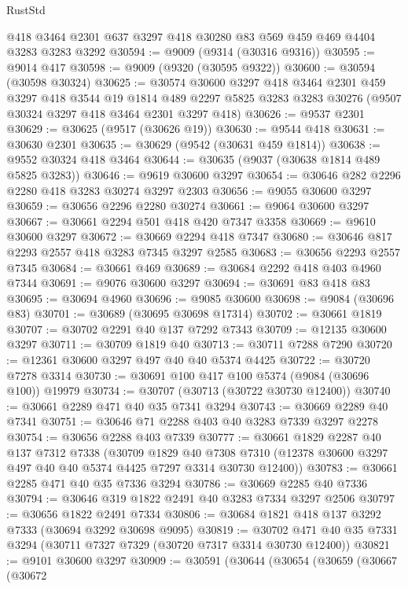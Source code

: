 \begin{lexlean}{RustStd}
\begin{coremodule}
    @418
    @3464
    @2301
    @637
    @3297
    @418
    @30280
    @83
    @569
    @459
    @469
    @4404
    @3283
    @3283
    @3292
@30594 := @9009 (@9314 (@30316 @9316))
@30595 := @9014 @417
@30598 := @9009 (@9320 (@30595 @9322))
@30600 := @30594 (@30598 @30324)
@30625 := @30574
    @30600
    @3297
    @418
    @3464
    @2301
    @459
    @3297
    @418
    @3544
    @19
    @1814
    @489
    @2297
    @5825
    @3283
    @3283
    @30276
    (@9507 @30324 @3297 @418 @3464 @2301 @3297 @418)
@30626 := @9537 @2301
@30629 := @30625 (@9517 (@30626 @19))
@30630 := @9544 @418
@30631 := @30630 @2301
@30635 := @30629 (@9542 (@30631 @459 @1814))
@30638 := @9552 @30324 @418 @3464
@30644 := @30635 (@9037 (@30638 @1814 @489 @5825 @3283))
@30646 := @9619 @30600 @3297
@30654 := @30646 @282 @2296 @2280 @418 @3283 @30274 @3297 @2303
@30656 := @9055 @30600 @3297
@30659 := @30656 @2296 @2280 @30274
@30661 := @9064 @30600 @3297
@30667 := @30661 @2294 @501 @418 @420 @7347 @3358
@30669 := @9610 @30600 @3297
@30672 := @30669 @2294 @418 @7347
@30680 := @30646 @817 @2293 @2557 @418 @3283 @7345 @3297 @2585
@30683 := @30656 @2293 @2557 @7345
@30684 := @30661 @469
@30689 := @30684 @2292 @418 @403 @4960 @7344
@30691 := @9076 @30600 @3297
@30694 := @30691 @83 @418 @83
@30695 := @30694 @4960
@30696 := @9085 @30600
@30698 := @9084 (@30696 @83)
@30701 := @30689 (@30695 @30698 @17314)
@30702 := @30661 @1819
@30707 := @30702 @2291 @40 @137 @7292 @7343
@30709 := @12135 @30600 @3297
@30711 := @30709 @1819 @40
@30713 := @30711 @7288 @7290
@30720 := @12361 @30600 @3297 @497 @40 @40 @5374 @4425
@30722 := @30720 @7278 @3314
@30730 := @30691 @100 @417 @100 @5374 (@9084 (@30696 @100)) @19979
@30734 := @30707 (@30713 (@30722 @30730 @12400))
@30740 := @30661 @2289 @471 @40 @35 @7341 @3294
@30743 := @30669 @2289 @40 @7341
@30751 := @30646 @71 @2288 @403 @40 @3283 @7339 @3297 @2278
@30754 := @30656 @2288 @403 @7339
@30777 := @30661
    @1829
    @2287
    @40
    @137
    @7312
    @7338
    (@30709
      @1829
      @40
      @7308
      @7310
      (@12378 @30600 @3297 @497 @40 @40 @5374 @4425 @7297 @3314 @30730 @12400))
@30783 := @30661 @2285 @471 @40 @35 @7336 @3294
@30786 := @30669 @2285 @40 @7336
@30794 := @30646 @319 @1822 @2491 @40 @3283 @7334 @3297 @2506
@30797 := @30656 @1822 @2491 @7334
@30806 := @30684 @1821 @418 @137 @3292 @7333 (@30694 @3292 @30698 @9095)
@30819 := @30702 @471 @40 @35 @7331 @3294 (@30711 @7327 @7329 (@30720 @7317 @3314 @30730 @12400))
@30821 := @9101 @30600 @3297
@30909 := @30591
    (@30644
      (@30654
        (@30659
          (@30667
            (@30672

\end{coremodule}
\end{lexlean}
